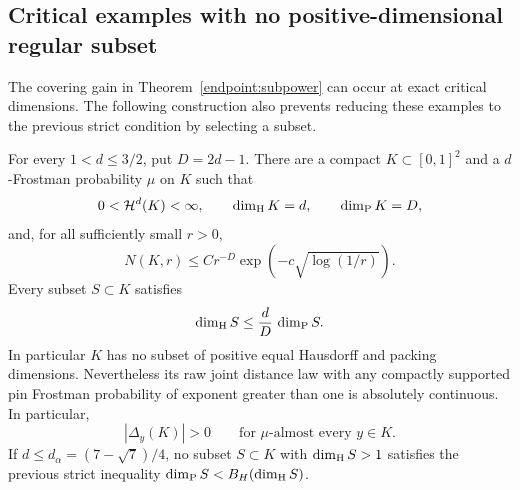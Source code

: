 \subsection{Critical examples with no positive-dimensional regular subset}
\label{criticalmoran:section}

The covering gain in Theorem~\ref{endpoint:subpower} can occur at exact
critical dimensions. The following construction also prevents reducing
these examples to the previous strict condition by selecting a subset.

\begin{theorem}\label{criticalmoran:theorem}
For every \(1<d\le3/2\), put \(D=2d-1\). There are a compact
\(K\subset[0,1]^2\) and a \(d\)-Frostman probability \(\mu\) on \(K\)
such that
\begin{equation}\label{criticalmoran:dimensions}
 0<\mathcal H^d(K)<\infty,\qquad \dim_{\mathrm H} K=d,\qquad \dim_{\mathrm P} K=D,
\end{equation}
and, for all sufficiently small \(r>0\),
\begin{equation}\label{criticalmoran:cover}
 N(K,r)\le Cr^{-D}\exp\!\left(-c\sqrt{\log(1/r)}\right).
\end{equation}
Every subset \(S\subset K\) satisfies
\begin{equation}\label{criticalmoran:hereditary}
 \dim_{\mathrm H} S\le\frac dD\,\dim_{\mathrm P} S.
\end{equation}
In particular \(K\) has no subset of positive equal Hausdorff and
packing dimensions. Nevertheless its raw joint distance law with any
compactly supported pin Frostman probability of exponent greater than
one is absolutely continuous. In particular,
\[
 |\Delta_y(K)|>0\qquad\text{for \(\mu\)-almost every }y\in K.
\]
If \(d\le d_\alpha=(7-\sqrt7)/4\), no subset \(S\subset K\) with
\(\dim_{\mathrm H} S>1\) satisfies the previous strict inequality
\(\dim_{\mathrm P} S<B_H(\dim_{\mathrm H} S)\).
\end{theorem}

